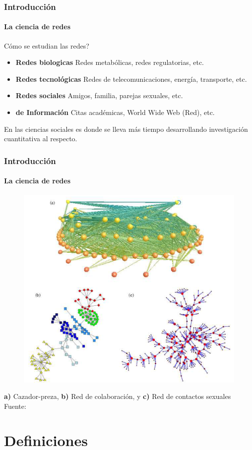 \documentclass[10pt]{beamer}
\begin{document}
\begin{frame}
\frametitle{Introducci\'on}
\framesubtitle{La ciencia de redes}

C\'omo se estudian las redes?

\begin{itemize}
\item {\bf Redes biologicas} Redes metab\'olicas, redes regulatorias, etc.
\item {\bf Redes tecnol\'ogicas} Redes de telecomunicaciones, energ\'ia, transporte, etc.
\item {\bf Redes sociales} Amigos, familia, parejas sexuales, etc.
\item {\bf de Informaci\'on} Citas acad\'emicas, World Wide Web (Red), etc.
\end{itemize}

En las ciencias sociales es donde se lleva m\'as tiempo desarrollando
investigaci\'on cuantitativa al respecto.

\end{frame}

\begin{frame}
\frametitle{Introducci\'on}
\framesubtitle{La ciencia de redes}
\begin{figure}
\centering
\includegraphics[width =.6\linewidth]{../media/redes_newman_2003.png}
\end{figure}
{\bf a)} Cazador-preza, {\bf b)} Red de colaboraci\'on, y {\bf c)} Red de contactos sexuales
{\footnotesize Fuente: \cite{newman2003structure}}
\end{frame}

\section{Definiciones}
\end{document}
